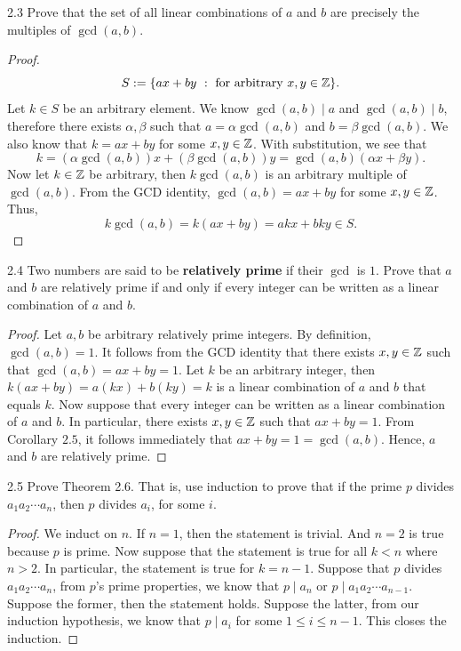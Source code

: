 \begin{exercise}{2.3}
    Prove that the set of all linear combinations of \(a\) and \(b\) are precisely the multiples of \(\gcd(a,b)\).
\end{exercise}
\begin{proof}
    \[S := \{ax+by\ :\ \text{for arbitrary }x,y \in \integers\}.\]
    Let \(k \in S\) be an arbitrary element.
    We know \(\gcd(a,b) \mid a\) and \(\gcd(a,b) \mid b\), therefore there exists \(\alpha, \beta\) such that \(a = \alpha\gcd(a,b)\) and \(b = \beta\gcd(a,b)\).
    We also know that \(k = ax+by\) for some \(x,y \in \mathbb{Z}\). With substitution, we see that \[k = (\alpha\gcd(a,b))x + (\beta\gcd(a,b))y = \gcd(a,b)(\alpha x+\beta y).\]
    Now let \(k \in \mathbb{Z}\) be arbitrary, then \(k\gcd(a,b)\) is an arbitrary multiple of \(\gcd(a,b)\).
    From the GCD identity, \(\gcd(a,b) = ax+by\) for some \(x,y \in \mathbb{Z}\). Thus, \[k\gcd(a,b) = k(ax+by) = akx + bky \in S.\]
\end{proof}

\begin{exercise}{2.4}
    Two numbers are said to be \textbf{relatively prime} if their \(\gcd\) is \(1\). Prove that \(a\) and \(b\) are relatively prime
    if and only if every integer can be written as a linear combination of \(a\) and \(b\).
\end{exercise}
\begin{proof}
    Let \(a,b\) be arbitrary relatively prime integers. By definition, \(\gcd(a,b) = 1\). It follows
    from the GCD identity that there exists \(x,y \in \mathbb{Z}\) such that \(\gcd(a,b) = ax+by = 1\).
    Let \(k\) be an arbitrary integer, then \(k(ax+by) = a(kx)+b(ky) = k\) is a linear combination of \(a\) and \(b\) that equals \(k\).
    Now suppose that every integer can be written as a linear combination of \(a\) and \(b\). In particular, there exists \(x,y \in \mathbb{Z}\) such that
    \(ax+by = 1\). From Corollary \(2.5\), it follows immediately that \(ax+by = 1 = \gcd(a,b)\). Hence, \(a\) and \(b\) are relatively prime.
\end{proof}

\begin{exercise}{2.5}
    Prove Theorem 2.6. That is, use induction to prove that if the prime \(p\) divides \(a_1 a_2 \cdots a_n\), then \(p\) divides \(a_i\), for some \(i\).
\end{exercise}
\begin{proof}
    \footnotemark We induct on \(n\). If \(n = 1\), then the statement is trivial. And \(n = 2\) is true because \(p\) is prime.
    Now suppose that the statement is true for all \(k < n\) where \(n > 2\). In particular, the statement is true for \(k = n-1\).
    Suppose that \(p\) divides \(a_1 a_2 \cdots a_n\), from \(p\)'s prime properties, we know that \(p \mid a_n\) or \(p \mid a_1 a_2 \cdots a_{n-1}\).
    Suppose the former, then the statement holds. Suppose the latter, from our induction hypothesis, we know that \(p \mid a_i\) for some \(1 \leq i \leq n-1\).
    This closes the induction.
\end{proof}

